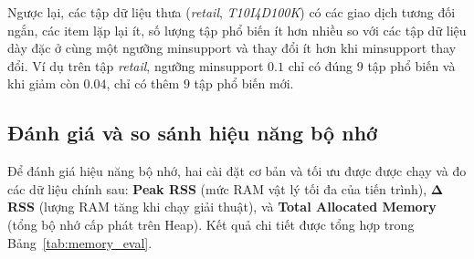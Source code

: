 \documentclass[conference]{IEEEtran}
\begin{document}
Ngược lại, các tập dữ liệu thưa (\textit{retail}, \textit{T10I4D100K}) có các giao dịch tương đối ngắn, các item lặp lại ít, số lượng tập phổ biến ít hơn nhiều so với các tập dữ liệu dày đặc ở cùng một ngưỡng minsupport và thay đổi ít hơn khi minsupport thay đổi. Ví dụ trên tập \textit{retail}, ngưỡng minsupport $0.1$ chỉ có đúng $9$ tập phổ biến và khi giảm còn $0.04$, chỉ có thêm $9$ tập phổ biến mới. 

\subsection{Đánh giá và so sánh hiệu năng bộ nhớ}
Để đánh giá hiệu năng bộ nhớ, hai cài đặt cơ bản và tối ưu được được chạy và đo các dữ liệu chính sau: \textbf{Peak RSS} (mức RAM vật lý tối đa của tiến trình), $\mathbf{\Delta}$\textbf{RSS} (lượng RAM tăng khi chạy giải thuật), và \textbf{Total Allocated Memory} (tổng bộ nhớ cấp phát trên Heap). Kết quả chi tiết được tổng hợp trong Bảng~\ref{tab:memory_eval}.
\end{document}
